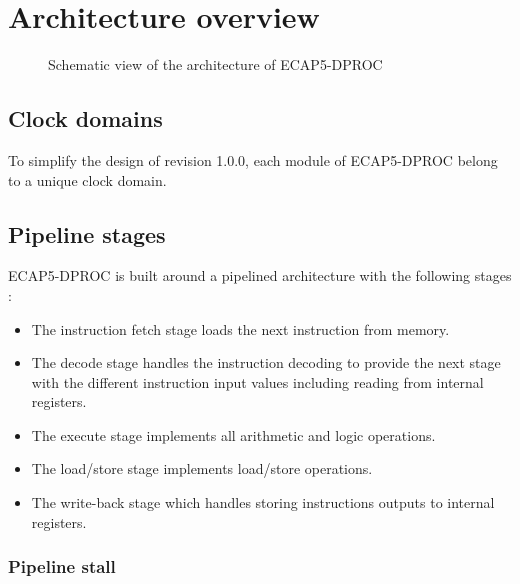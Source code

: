 \section{Architecture overview}

  \begin{figure}[H]
      \centering
      
      \caption{Schematic view of the architecture of ECAP5-DPROC}
      \label{fig:architecture}
    \end{figure}

  \subsection{Clock domains}

    \begin{content}
        To simplify the design of revision 1.0.0, each module of ECAP5-DPROC belong to a unique clock domain.
      \end{content}

  \subsection{Pipeline stages}
  \label{sec:pipeline-stages}

    \begin{content}
        ECAP5-DPROC is built around a pipelined architecture with the following stages :
        \begin{itemize}
            \item The instruction fetch stage loads the next instruction from memory.
            \item The decode stage handles the instruction decoding to provide the next stage with the different instruction input values including reading from internal registers.
            \item The execute stage implements all arithmetic and logic operations.
            \item The load/store stage implements load/store operations.
            \item The write-back stage which handles storing instructions outputs to internal registers.
          \end{itemize}
      \end{content}

    \subsubsection{Pipeline stall}

